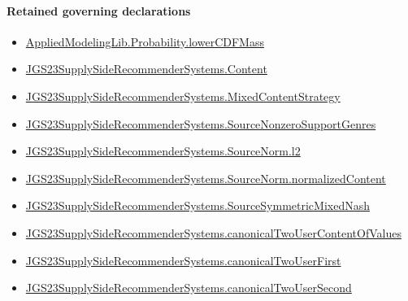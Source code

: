 \documentclass[10pt]{article}
\begin{document}
\paragraph{Retained governing declarations}
\begin{itemize}\raggedright
\item \hyperlink{governing-declaration-5dfc240c860659bf}{Applied\allowbreak{}Modeling\allowbreak{}Lib.\allowbreak{}Probability.\allowbreak{}lower\allowbreak{}CDF\allowbreak{}Mass}
\item \hyperlink{governing-declaration-367305fda50f0ada}{JGS23\allowbreak{}Supply\allowbreak{}Side\allowbreak{}Recommender\allowbreak{}Systems.\allowbreak{}Content}
\item \hyperlink{governing-declaration-2089965d06cf0282}{JGS23\allowbreak{}Supply\allowbreak{}Side\allowbreak{}Recommender\allowbreak{}Systems.\allowbreak{}Mixed\allowbreak{}Content\allowbreak{}Strategy}
\item \hyperlink{governing-declaration-78e20e84abcc253b}{JGS23\allowbreak{}Supply\allowbreak{}Side\allowbreak{}Recommender\allowbreak{}Systems.\allowbreak{}Source\allowbreak{}Nonzero\allowbreak{}Support\allowbreak{}Genres}
\item \hyperlink{governing-declaration-9299663ffe3ecb38}{JGS23\allowbreak{}Supply\allowbreak{}Side\allowbreak{}Recommender\allowbreak{}Systems.\allowbreak{}Source\allowbreak{}Norm.\allowbreak{}l2}
\item \hyperlink{governing-declaration-dd171705f4075880}{JGS23\allowbreak{}Supply\allowbreak{}Side\allowbreak{}Recommender\allowbreak{}Systems.\allowbreak{}Source\allowbreak{}Norm.\allowbreak{}normalized\allowbreak{}Content}
\item \hyperlink{governing-declaration-8919e7334fa5ab60}{JGS23\allowbreak{}Supply\allowbreak{}Side\allowbreak{}Recommender\allowbreak{}Systems.\allowbreak{}Source\allowbreak{}Symmetric\allowbreak{}Mixed\allowbreak{}Nash}
\item \hyperlink{governing-declaration-7ec7c4b0b62e0ca8}{JGS23\allowbreak{}Supply\allowbreak{}Side\allowbreak{}Recommender\allowbreak{}Systems.\allowbreak{}canonical\allowbreak{}Two\allowbreak{}User\allowbreak{}Content\allowbreak{}Of\allowbreak{}Values}
\item \hyperlink{governing-declaration-abb7b5a1ce6f14ba}{JGS23\allowbreak{}Supply\allowbreak{}Side\allowbreak{}Recommender\allowbreak{}Systems.\allowbreak{}canonical\allowbreak{}Two\allowbreak{}User\allowbreak{}First}
\item \hyperlink{governing-declaration-fb292a037babdd07}{JGS23\allowbreak{}Supply\allowbreak{}Side\allowbreak{}Recommender\allowbreak{}Systems.\allowbreak{}canonical\allowbreak{}Two\allowbreak{}User\allowbreak{}Second}

\end{itemize}
\end{document}
